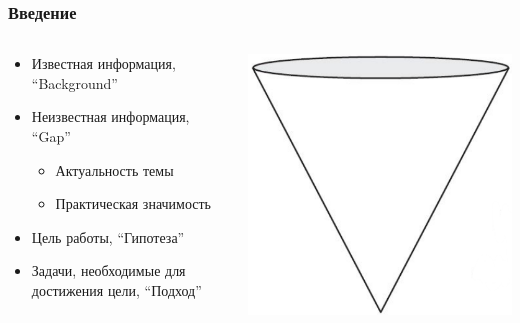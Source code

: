 \documentclass[xetex,mathserif,serif]{beamer}
\begin{document}
    \begin{frame}
        \frametitle{Введение}
        \begin{columns}
            \begin{column}{0.6\textwidth}
                \begin{itemize}
                    \item Известная информация, ``Background''
                    \item Неизвестная информация, ``Gap''
                    \begin{itemize}
                        \item Актуальность темы
                        \item Практическая значимость
                    \end{itemize}
                    \item Цель работы, ``Гипотеза'' 
                    \item Задачи, необходимые для достижения цели, ``Подход''
                \end{itemize}
            \end{column}
            \begin{column}{0.4\textwidth}
                \begin{center}
                    \includegraphics[width=\textwidth]{introductionCone.png}
                \end{center}
            \end{column}
        \end{columns}
    \end{frame}
\end{document}
